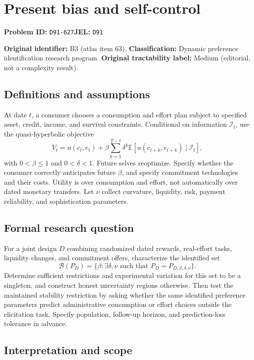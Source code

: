 \documentclass[11pt,a4paper]{article}
\begin{document}
\section*{Present bias and self-control}
\textbf{Problem ID:} \texttt{D91-627}\quad \textbf{JEL:} \texttt{D91}\par
\label{problem:OP-0063}
\label{atlas:prob:B3}

\noindent\textbf{Original identifier:} B3 (atlas item 63). \textbf{Classification:} Dynamic preference identification research program. \textbf{Original tractability label:} Medium (editorial, not a complexity result).

\subsection*{Definitions and assumptions}

At date $t$, a consumer chooses a consumption and effort plan subject to specified asset, credit, income, and survival constraints. Conditional on information $\mathcal I_t$, use the quasi-hyperbolic objective
\[
V_t=u(c_t,e_t)+\beta\sum_{k=1}^{T-t}\delta^k\mathbb E[u(c_{t+k},e_{t+k})\mid\mathcal I_t],
\]
with $0<\beta\leq1$ and $0<\delta<1$. Future selves reoptimize. Specify whether the consumer correctly anticipates future $\beta$, and specify commitment technologies and their costs. Utility is over consumption and effort, not automatically over dated monetary transfers. Let $\nu$ collect curvature, liquidity, risk, payment reliability, and sophistication parameters.

\subsection*{Formal research question}

For a joint design $D$ combining randomized dated rewards, real-effort tasks, liquidity changes, and commitment offers, characterize the identified set
\[
\mathcal B(P_D)=\{\beta:\exists\delta,\nu\text{ such that }P_D=P_{D,\beta,\delta,\nu}\}.
\]
Determine sufficient restrictions and experimental variation for this set to be a singleton, and construct honest uncertainty regions otherwise. Then test the maintained stability restriction by asking whether the same identified preference parameters predict administrative consumption or effort choices outside the elicitation task. Specify population, follow-up horizon, and prediction-loss tolerance in advance.

\subsection*{Interpretation and scope}
\end{document}
